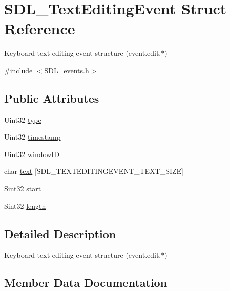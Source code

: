 \hypertarget{struct_s_d_l___text_editing_event}{}\section{S\+D\+L\+\_\+\+Text\+Editing\+Event Struct Reference}
\label{struct_s_d_l___text_editing_event}


Keyboard text editing event structure (event.\+edit.$\ast$)  




{\ttfamily \#include $<$S\+D\+L\+\_\+events.\+h$>$}

\subsection*{Public Attributes}
\begin{DoxyCompactItemize}
\item 
Uint32 \mbox{\hyperlink{struct_s_d_l___text_editing_event_a198e6df194a3bf12cf5f82553e84c7cb}{type}}
\item 
Uint32 \mbox{\hyperlink{struct_s_d_l___text_editing_event_afc164f40abee6fd8e72e01b589210c75}{timestamp}}
\item 
Uint32 \mbox{\hyperlink{struct_s_d_l___text_editing_event_a23b3e414cf7a7ccc547b7595ca930049}{window\+ID}}
\item 
char \mbox{\hyperlink{struct_s_d_l___text_editing_event_a29848c2e7819ea98ae8fb08543e6d420}{text}} \mbox{[}S\+D\+L\+\_\+\+T\+E\+X\+T\+E\+D\+I\+T\+I\+N\+G\+E\+V\+E\+N\+T\+\_\+\+T\+E\+X\+T\+\_\+\+S\+I\+ZE\mbox{]}
\item 
Sint32 \mbox{\hyperlink{struct_s_d_l___text_editing_event_ac6c6a00835d92b12c0ba5b78b5ad676d}{start}}
\item 
Sint32 \mbox{\hyperlink{struct_s_d_l___text_editing_event_adca95505c0bf212834930df58f6d1aa5}{length}}
\end{DoxyCompactItemize}


\subsection{Detailed Description}
Keyboard text editing event structure (event.\+edit.$\ast$) 

\subsection{Member Data Documentation}
\mbox{\label{struct_s_d_l___text_editing_event_adca95505c0bf212834930df58f6d1aa5}} 
